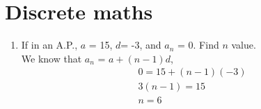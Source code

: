 \documentclass[journal,12pt,twocolumn]{IEEEtran}
\renewcommand\thesection{\arabic{section}}
\begin{document}
\section{Discrete maths}
\renewcommand{\theequation}{\theenumi}
\begin{enumerate}[label=\thesection.\arabic*.,ref=\thesection.\theenumi]
\item If in an A.P., $a$ = 15, $d$= -3, and $a_n$ = 0. Find $n$ value. \\
\solution We know that $a_n$ = $a+(n-1)d$,
\begin{align}
& 0 = 15+ (n-1)(-3) \nonumber \\
& 3(n-1) = 15 \nonumber \\ 
& n = 6 \nonumber 
\end{align}


\end{enumerate}
\end{document}
